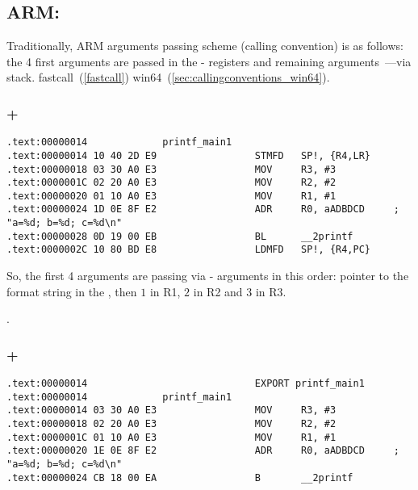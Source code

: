 \subsection{ARM: }

{Traditionally, ARM arguments passing scheme (calling convention) is as follows:
the 4 first arguments are passed in the - registers and remaining arguments~---via stack}.
fastcall~(\ref{fastcall}) \OrENRU win64~(\ref{sec:callingconventions_win64}).

\subsubsection{\NonOptimizingKeil + \ARMMode}

\begin{lstlisting}[caption=\NonOptimizingKeil + \ARMMode]
.text:00000014             printf_main1
.text:00000014 10 40 2D E9                 STMFD   SP!, {R4,LR}
.text:00000018 03 30 A0 E3                 MOV     R3, #3
.text:0000001C 02 20 A0 E3                 MOV     R2, #2
.text:00000020 01 10 A0 E3                 MOV     R1, #1
.text:00000024 1D 0E 8F E2                 ADR     R0, aADBDCD     ; "a=%d; b=%d; c=%d\n"
.text:00000028 0D 19 00 EB                 BL      __2printf
.text:0000002C 10 80 BD E8                 LDMFD   SP!, {R4,PC}
\end{lstlisting}

{So, the first 4 arguments are passing via - arguments in this order:
pointer to the \printf format string in the , then $1$ in R1, $2$ in R2 and $3$ in R3}.

.

\subsubsection{\OptimizingKeil + \ARMMode}
\label{ARM_B_to_printf}

\begin{lstlisting}[caption=\OptimizingKeil + \ARMMode]
.text:00000014                             EXPORT printf_main1
.text:00000014             printf_main1
.text:00000014 03 30 A0 E3                 MOV     R3, #3
.text:00000018 02 20 A0 E3                 MOV     R2, #2
.text:0000001C 01 10 A0 E3                 MOV     R1, #1
.text:00000020 1E 0E 8F E2                 ADR     R0, aADBDCD     ; "a=%d; b=%d; c=%d\n"
.text:00000024 CB 18 00 EA                 B       __2printf
\end{lstlisting}

